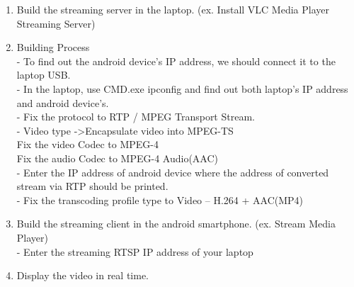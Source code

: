 \documentclass[12pt]{article}
\begin{document}
\begin{enumerate}
\item Build the streaming server in the laptop. (ex. Install VLC Media Player Streaming Server)\\
\item Building Process\\
 - To find out the android device’s IP address, we should connect it to the laptop USB.\\
 - In the laptop, use CMD.exe ipconfig and find out both laptop’s IP address and android device’s.\\
 - Fix the protocol to RTP / MPEG Transport Stream.\\
 - Video type ->Encapsulate video into MPEG-TS\\
                          Fix the video Codec to MPEG-4\\
                          Fix the audio Codec to MPEG-4 Audio(AAC)\\
 - Enter the IP address of android device where the address of converted stream via RTP should be printed.\\
 - Fix the transcoding profile type to Video – H.264 + AAC(MP4)\\
\item Build the streaming client in the android smartphone. (ex. Stream Media Player)\\
 - Enter the streaming RTSP IP address of your laptop\\
\item Display the video in real time.\\
\end{enumerate}

\end{document}
